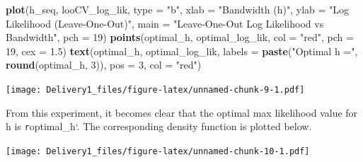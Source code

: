 \documentclass[
]{article}
\newenvironment{Shaded}{\begin{snugshade}}{\end{snugshade}}
\newcommand{\AttributeTok}[1]{\textcolor[rgb]{0.13,0.29,0.53}{#1}}
\newcommand{\DecValTok}[1]{\textcolor[rgb]{0.00,0.00,0.81}{#1}}
\newcommand{\FloatTok}[1]{\textcolor[rgb]{0.00,0.00,0.81}{#1}}
\newcommand{\FunctionTok}[1]{\textcolor[rgb]{0.13,0.29,0.53}{\textbf{#1}}}
\newcommand{\NormalTok}[1]{#1}
\newcommand{\OtherTok}[1]{\textcolor[rgb]{0.56,0.35,0.01}{#1}}
\newcommand{\SpecialCharTok}[1]{\textcolor[rgb]{0.81,0.36,0.00}{\textbf{#1}}}
\newcommand{\StringTok}[1]{\textcolor[rgb]{0.31,0.60,0.02}{#1}}
\begin{document}
\begin{Shaded}
\begin{Highlighting}[]
\FunctionTok{plot}\NormalTok{(h\_seq, looCV\_log\_lik, }\AttributeTok{type =} \StringTok{"b"}\NormalTok{, }\AttributeTok{xlab =} \StringTok{"Bandwidth (h)"}\NormalTok{, }\AttributeTok{ylab =} \StringTok{"Log Likelihood (Leave{-}One{-}Out)"}\NormalTok{,}
     \AttributeTok{main =} \StringTok{"Leave{-}One{-}Out Log Likelihood vs Bandwidth"}\NormalTok{, }\AttributeTok{pch =} \DecValTok{19}\NormalTok{)}
\FunctionTok{points}\NormalTok{(optimal\_h, optimal\_log\_lik, }\AttributeTok{col =} \StringTok{"red"}\NormalTok{, }\AttributeTok{pch =} \DecValTok{19}\NormalTok{, }\AttributeTok{cex =} \FloatTok{1.5}\NormalTok{)}
\FunctionTok{text}\NormalTok{(optimal\_h, optimal\_log\_lik, }\AttributeTok{labels =} \FunctionTok{paste}\NormalTok{(}\StringTok{"Optimal h ="}\NormalTok{, }\FunctionTok{round}\NormalTok{(optimal\_h, }\DecValTok{3}\NormalTok{)), }\AttributeTok{pos =} \DecValTok{3}\NormalTok{, }\AttributeTok{col =} \StringTok{"red"}\NormalTok{)}
\end{Highlighting}
\end{Shaded}

\texttt{[image: Delivery1\_files/figure-latex/unnamed-chunk-9-1.pdf]}

From this experiment, it becomes clear that the optimal max likelihood
value for h is \texttt{r}optimal\_h`. The corresponding density function
is plotted below.

\begin{Shaded}
\end{Shaded}

\texttt{[image: Delivery1\_files/figure-latex/unnamed-chunk-10-1.pdf]}
\end{document}
